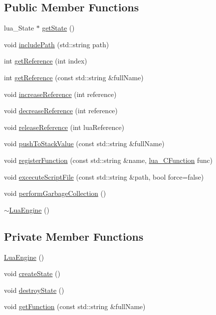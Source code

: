 \subsection*{Public Member Functions}
\begin{DoxyCompactItemize}
\item 
lua\+\_\+\+State $\ast$ \hyperlink{classZeta_1_1LuaEngine_a6243b6e56304a41c5c46808b8f405110}{get\+State} ()
\item 
void \hyperlink{classZeta_1_1LuaEngine_a3c24040b93a059c70a79ccd0380b6771}{include\+Path} (std\+::string path)
\item 
int \hyperlink{classZeta_1_1LuaEngine_a4c6758aaf0f4fec27032f6d032d8a45c}{get\+Reference} (int index)
\item 
int \hyperlink{classZeta_1_1LuaEngine_ac196eab11779d991559d94f89533523f}{get\+Reference} (const std\+::string \&full\+Name)
\item 
void \hyperlink{classZeta_1_1LuaEngine_abced20bfcc3b0b9382a891f3f3e5458c}{increase\+Reference} (int reference)
\item 
void \hyperlink{classZeta_1_1LuaEngine_ad36d9187ac9a5d794722169f5b916f59}{decrease\+Reference} (int reference)
\item 
void \hyperlink{classZeta_1_1LuaEngine_ad7ea8746b8018280f07393a011486738}{release\+Reference} (int lua\+Reference)
\item 
void \hyperlink{classZeta_1_1LuaEngine_a7e14b6a034d71ee1691d967317ae5f78}{push\+To\+Stack\+Value} (const std\+::string \&full\+Name)
\item 
void \hyperlink{classZeta_1_1LuaEngine_aae892ca8271565dfc2438bf0794d52b4}{register\+Function} (const std\+::string \&name, \hyperlink{ZetaConfig_8hpp_a5f5bedea265eccf43c6e404e020988ce}{lua\+\_\+\+C\+Function} func)
\item 
void \hyperlink{classZeta_1_1LuaEngine_ab65326b6249a6da8a4113c708fb07d80}{excecute\+Script\+File} (const std\+::string \&path, bool force=false)
\item 
void \hyperlink{classZeta_1_1LuaEngine_a1d8c46316ba05608992740d8f6624e06}{perform\+Garbage\+Collection} ()
\item 
\hyperlink{classZeta_1_1LuaEngine_ad7b697451f5321df636f807c01b40939}{$\sim$\+Lua\+Engine} ()
\end{DoxyCompactItemize}
\subsection*{Private Member Functions}
\begin{DoxyCompactItemize}
\item 
\hyperlink{classZeta_1_1LuaEngine_a016308cae95287e1f5ca00592db9169b}{Lua\+Engine} ()
\item 
void \hyperlink{classZeta_1_1LuaEngine_a26ce27255b6b26603ffc08251f7043e7}{create\+State} ()
\item 
void \hyperlink{classZeta_1_1LuaEngine_a5ab62f14dc4cad15e2653b8af65abb3f}{destroy\+State} ()
\item 
void \hyperlink{classZeta_1_1LuaEngine_a08d7bed35fde73a1f6aa5c68c1f687ca}{get\+Function} (const std\+::string \&full\+Name)
\end{DoxyCompactItemize}
